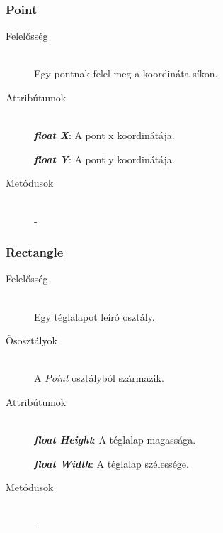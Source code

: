\subsubsection{Point}
	\begin{description}
		\item[Felelősség] \hfill \\
		Egy pontnak felel meg a koordináta-síkon.
		
		\item[Attribútumok]\hfill \\
		\textbf{\emph{float X}}: A pont x koordinátája.
		
		\textbf{\emph{float Y}}: A pont y koordinátája.		
				
		\item[Metódusok]\hfill \\
		-

	\end{description}
	
\subsubsection{Rectangle}
	\begin{description}
		\item[Felelősség] \hfill \\
		Egy téglalapot leíró osztály.
		
		\item[Ősosztályok] \hfill \\
		A {\itshape Point}	osztályból származik.		
		
		\item[Attribútumok]\hfill \\
		\textbf{\emph{float Height}}: A téglalap magassága.
		
		\textbf{\emph{float Width}}: A téglalap szélessége.		
				
		\item[Metódusok]\hfill \\
		-

	\end{description}
	
